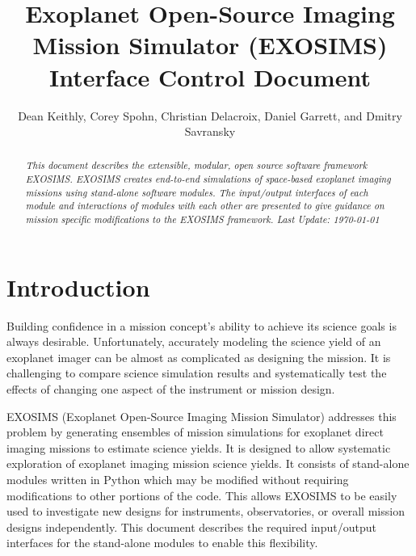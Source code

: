 \documentclass[cleanfoot]{asme2ej}
\title{Exoplanet Open-Source Imaging Mission Simulator (EXOSIMS) \\ Interface Control Document}
\author{Dean Keithly, Corey Spohn, Christian Delacroix, Daniel Garrett, and Dmitry Savransky
    \affiliation{
    Sibley School of Mechanical and Aerospace Engineering\\
	Cornell University\\
	Ithaca, NY 14853
    }	
}
\begin{document}
\maketitle    

\begin{abstract}
{\it This document describes the extensible, modular, open source software framework EXOSIMS.  EXOSIMS creates end-to-end simulations of space-based exoplanet imaging missions using stand-alone software modules.  The input/output interfaces of each module and interactions of modules with each other are presented to give guidance on mission specific modifications to the EXOSIMS framework. Last Update: \today}
\end{abstract}

\tableofcontents

\begin{nomenclature}
\end{nomenclature}


\section{Introduction} 
Building confidence in a mission concept's ability to achieve its science goals is always desirable.  Unfortunately, accurately modeling the science yield of an exoplanet imager can be almost as complicated as designing the mission.  It is challenging to compare science simulation results and systematically test the effects of changing one aspect of the instrument or mission design.

EXOSIMS (Exoplanet Open-Source Imaging Mission Simulator) addresses this problem by generating ensembles of mission simulations for exoplanet direct imaging missions to estimate science yields. It is designed to allow systematic exploration of exoplanet imaging mission science yields.  It consists of stand-alone modules written in Python which may be modified without requiring modifications to other portions of the code. This allows EXOSIMS to be easily used to investigate new designs for instruments, observatories, or overall mission designs independently. This document describes the required input/output interfaces for the stand-alone modules to enable this flexibility.
\end{document}
